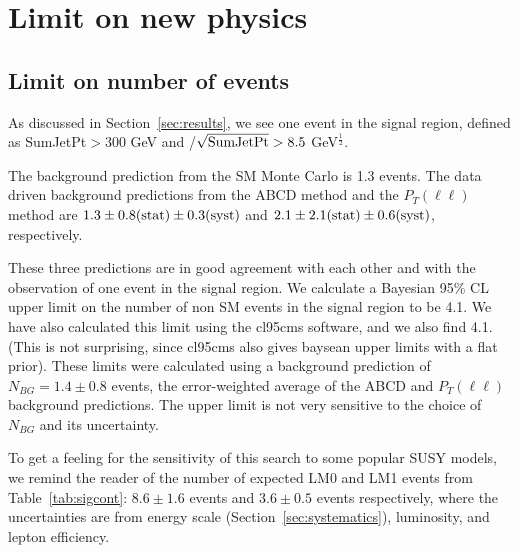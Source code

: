 \section{Limit on new physics}
\label{sec:limit}


\subsection{Limit on number of events}
\label{sec:limnumevents}
As discussed in Section~\ref{sec:results}, we see one event 
in the signal region, defined as SumJetPt$>$300 GeV and 
\met/$\sqrt{\rm SumJetPt}>8.5$ GeV$^{\frac{1}{2}}$.

The background prediction from the SM Monte Carlo is 1.3 events.
The data driven background predictions from the ABCD method 
and the $P_T(\ell\ell)$ method are $1.3 \pm 0.8({\rm stat}) \pm 0.3({\rm syst})$ 
and $2.1 \pm 2.1({\rm stat}) \pm 0.6({\rm syst})$, respectively.

These three predictions are in good agreement with each other
and with the observation of one event in the signal region.
We calculate a Bayesian 95\% CL upper limit\cite{ref:bayes.f} 
on the number of non SM events in the signal region to be 4.1.
We have also calculated this limit using 
the cl95cms software\cite{ref:cl95cms}, 
and we also find 4.1.  (This is not surprising, since cl95cms
also gives baysean upper limits with a flat prior).
These limits were calculated using a background prediction of $N_{BG} = 1.4 \pm 0.8$
events, the error-weighted average of the ABCD and $P_T(\ell\ell)$ background 
predictions.  The upper limit is not very sensitive to the choice of
$N_{BG}$ and its uncertainty.

To get a feeling for the sensitivity of this search to some
popular SUSY models, we remind the reader of the number of expected
LM0 and LM1 events from Table~\ref{tab:sigcont}: $8.6 \pm 1.6$ 
events and $3.6 \pm 0.5$ events respectively, where the uncertainties
are from energy scale (Section~\ref{sec:systematics}), luminosity,
and lepton efficiency.


